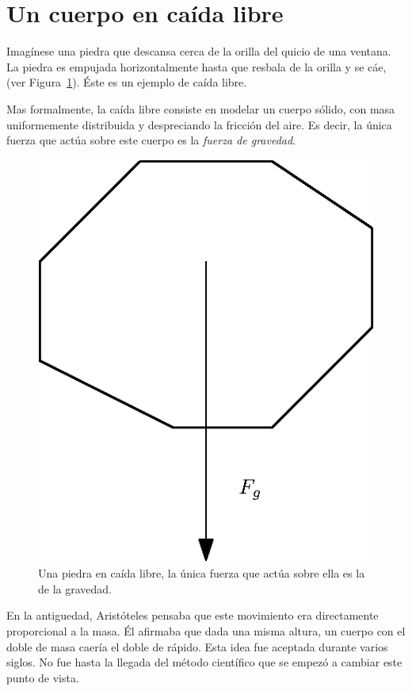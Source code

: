 \section{Un cuerpo en caída libre}
Imagínese una piedra que descansa cerca de la orilla del quicio de una ventana.
La piedra es empujada horizontalmente hasta que resbala de la orilla y se cáe, (ver Figura~\ref{piedra:fig}).
Éste es un ejemplo de caída libre.

Mas formalmente, la caída libre consiste en modelar un cuerpo sólido, con masa uniformemente distribuida y despreciando la fricción del aire.
Es decir, la única fuerza que actúa sobre este cuerpo es la \emph{fuerza de gravedad}.

\begin{figure}
 \centering
 \includegraphics[]{Img/01/caida_libre}
 \caption[Ejemplo de caída libre]{ 
 Una piedra en caída libre, la única fuerza que actúa sobre ella es la de la gravedad.
 } \label{piedra:fig}
\end{figure}

En la antiguedad, Aristóteles pensaba que este movimiento era directamente proporcional a la masa.
Él afirmaba que dada una misma altura, un cuerpo con el doble de masa caería el doble de rápido.
Esta idea fue aceptada durante varios siglos.
No fue hasta la llegada del método científico que se empezó a cambiar este punto de vista.

